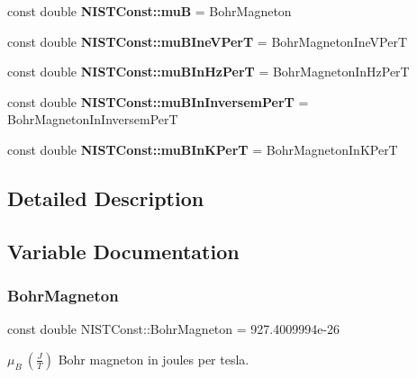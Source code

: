 \begin{DoxyCompactItemize}
\mbox{\label{group___bohr_magneton_gab42ee32e5e0323fc6268a5e14ac40b39}} 
const double {\bfseries N\+I\+S\+T\+Const\+::muB} = Bohr\+Magneton
\item 
\mbox{\label{group___bohr_magneton_gad2bd4164d07de53146b14398c6d4790d}} 
const double {\bfseries N\+I\+S\+T\+Const\+::mu\+B\+Ine\+V\+PerT} = Bohr\+Magneton\+Ine\+V\+PerT
\item 
\mbox{\label{group___bohr_magneton_gac590bf03985de37cfaeea7982dac2aa8}} 
const double {\bfseries N\+I\+S\+T\+Const\+::mu\+B\+In\+Hz\+PerT} = Bohr\+Magneton\+In\+Hz\+PerT
\item 
\mbox{\label{group___bohr_magneton_ga4d426841ef01963272df91bd0534a966}} 
const double {\bfseries N\+I\+S\+T\+Const\+::mu\+B\+In\+Inversem\+PerT} = Bohr\+Magneton\+In\+Inversem\+PerT
\item 
\mbox{\label{group___bohr_magneton_ga51473ab154d1c4e8e9afca84952db156}} 
const double {\bfseries N\+I\+S\+T\+Const\+::mu\+B\+In\+K\+PerT} = Bohr\+Magneton\+In\+K\+PerT
\end{DoxyCompactItemize}


\subsection{Detailed Description}


\subsection{Variable Documentation}
\mbox{\label{group___bohr_magneton_gaace59be8951a23257cedcbef8f320c66}} 
\subsubsection{\texorpdfstring{Bohr\+Magneton}{BohrMagneton}}
{\footnotesize\ttfamily const double N\+I\+S\+T\+Const\+::\+Bohr\+Magneton = 927.\+4009994e-\/26}

$\mu_B \ (\frac{J}{T})$ Bohr magneton in joules per tesla. \mbox{\label{group___bohr_magneton_ga8b97d10b13a2c5de4f0d268370bc3c50}} 
